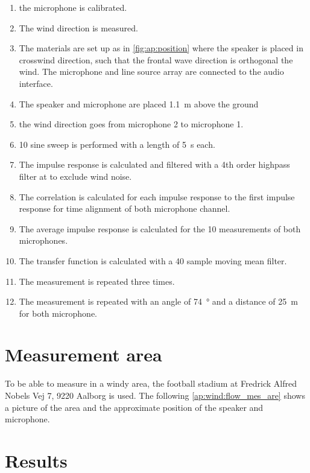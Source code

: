 \begin{enumerate}
\item the microphone is calibrated.
\item The wind direction is measured.
\item The materials are set up as in \autoref{fig:ap:position} where the speaker is placed in crosswind direction, such that the frontal wave direction is orthogonal the wind. The microphone and line source array are connected to the audio interface.
\item The speaker and microphone are placed \SI{1.1}{\meter} above the ground
\item the wind direction goes from microphone 2 to microphone 1.
\item 10 sine sweep is performed with a length of \SI{5}{\second} each. 
\item The impulse response is calculated and filtered with a 4th order highpass filter at  to exclude wind noise.
\item The correlation is calculated for each impulse response to the first impulse response for time alignment \citep{gunness2001loudspeaker} of both microphone channel.
\item The average impulse response is calculated for the 10 measurements of both microphones.
\item The transfer function is calculated with a 40 sample moving mean filter.
\item The measurement is repeated three times.
\item The measurement is repeated with an angle of \SI{74}{\degree} and a distance of \SI{25}{\meter} for both microphone.
\end{enumerate}


\section*{Measurement area}
To be able to measure in a windy area, the football stadium at Fredrick Alfred Nobels Vej 7, 9220 Aalborg is used. The following \autoref{ap:wind:flow_mes_are} shows a picture of the area and the approximate position of the speaker and microphone.


\section*{Results}

